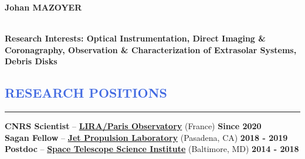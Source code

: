 \documentclass[11pt]{article}
\begin{document}
\lhead[]{}
\lfoot{\textcolor{Gray}{CV last update: \monthyeardate\today}}

\begin{huge}
\noindent\textbf{Johan MAZOYER}
\end{huge}\\


\textbf{Research Interests: Optical Instrumentation, Direct Imaging \& Coronagraphy,
Observation \& Characterization of Extrasolar Systems, Debris Disks}\\


\vspace{-1.0cm}
\textcolor{RoyalBlue}{\section{\large RESEARCH POSITIONS}
\vspace{-0.35cm}\hrule}
\vspace{0.4cm}

\textbf{CNRS Scientist} --
\href{http://www.obspm.fr/?lang=en}{\textbf{LIRA/Paris Observatory}} (France)
\hfill     	 { \bf Since 2020}\\

\vspace{-0.3cm}
\textbf{Sagan Fellow} --
\href{https://www.jpl.nasa.gov/}{\textbf{Jet Propulsion Laboratory}} (Pasadena, CA)
\hfill      { \bf 2018 - 2019}\\


\vspace{-0.3cm}
\textbf{Postdoc} --
{\href{http://www.stsci.edu}{\textbf{Space Telescope Science Institute}}} (Baltimore, MD)
\hfill        { \bf 2014 - 2018}\\
\end{document}
